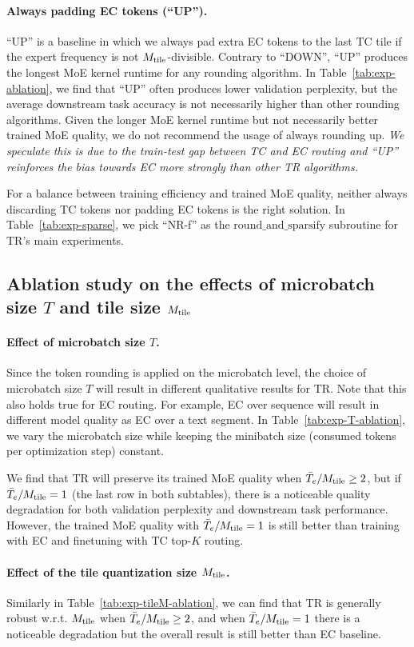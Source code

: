 \paragraph{Always padding EC tokens (``UP'').} ``UP'' is a baseline in which we always pad extra EC tokens to the last TC tile if the expert frequency is not $M_\mathrm{tile}$-divisible. Contrary to ``DOWN'', ``UP'' produces the longest MoE kernel runtime for any rounding algorithm. In Table~\ref{tab:exp-ablation}, we find that ``UP'' often produces lower validation perplexity, but the average downstream task accuracy is not necessarily higher than other rounding algorithms. Given the longer MoE kernel runtime but not necessarily better trained MoE quality, we do not recommend the usage of always rounding up. \textit{We speculate this is due to the train-test gap between TC and EC routing and ``UP'' reinforces the bias towards EC more strongly than other TR algorithms.} 


For a balance between training efficiency and trained MoE quality, neither always discarding TC tokens nor padding EC tokens is the right solution. In Table~\ref{tab:exp-sparse}, we pick ``NR-f'' as the $\mathrm{round\_and\_sparsify}$ subroutine for TR's main experiments.  


\subsection{Ablation study on the effects of microbatch size $T$ and tile size $M_\mathrm{tile}$} \label{sec:appendix:ablation-microbatch-tileM}


\paragraph{Effect of microbatch size $T$.} Since the token rounding is applied on the microbatch level, the choice of microbatch size $T$ will result in different qualitative results for TR. Note that this also holds true for EC routing. For example, EC over sequence will result in different model quality as EC over a text segment. In Table~\ref{tab:exp-T-ablation}, we vary the microbatch size while keeping the minibatch size (consumed tokens per optimization step) constant. 

We find that TR will preserve its trained MoE quality when $\bar{T}_e/M_\mathrm{tile} \ge 2$, but if $\bar{T}_e/M_\mathrm{tile} = 1$ (the last row in both subtables), there is a noticeable quality degradation for both validation perplexity and downstream task performance. However, the trained MoE quality with $\bar{T}_e/M_\mathrm{tile} = 1$ is still better than training with EC and finetuning with TC top-$K$ routing. 


\paragraph{Effect of the tile quantization size $M_\mathrm{tile}$.} Similarly in Table~\ref{tab:exp-tileM-ablation}, we can find that TR is generally robust w.r.t. $M_\mathrm{tile}$ when $\bar{T}_e/M_\mathrm{tile} \geq 2$, and when $\bar{T}_e/M_\mathrm{tile}=1$ there is a noticeable degradation but the overall result is still better than EC baseline. 





